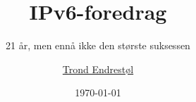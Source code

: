 \title{\textbf{IPv6-foredrag}}
\subtitle{21 år, men ennå ikke den største suksessen}
\author[T.~Endrestøl]{\href{http://fig.ol.no/~trond/}{Trond Endrestøl}}
\date{\today} %



\makeatletter
{}
\makeatother

\begin{frame}
  \titlepage
\end{frame}

